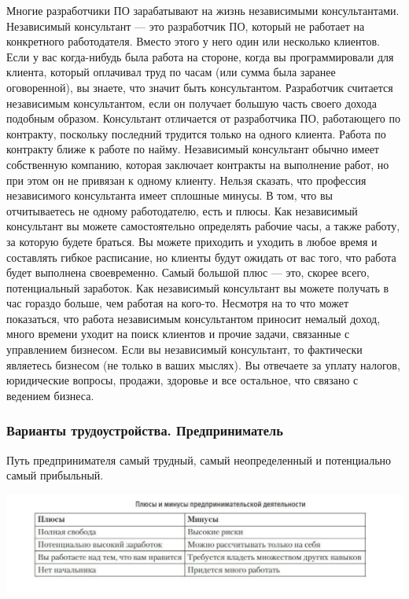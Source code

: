 \documentclass{../industrial-development}
\begin{document}
\lecturenotes
Многие разработчики ПО зарабатывают на жизнь независимыми консультантами. Независимый консультант — это разработчик ПО, который не работает на конкретного работодателя. Вместо этого у него один или несколько клиентов. Если у вас когда-нибудь была работа на стороне, когда вы программировали для клиента, который оплачивал труд по часам (или сумма была заранее оговоренной), вы знаете, что значит быть консультантом.
Разработчик считается независимым консультантом, если он получает большую часть своего дохода подобным образом. Консультант отличается от разработчика ПО, работающего по контракту, поскольку последний трудится только на одного  клиента. Работа по контракту ближе к работе по найму. Независимый консультант обычно имеет собственную компанию, которая заключает контракты на выполнение работ, но при этом он не привязан к одному клиенту.
Нельзя сказать, что профессия независимого консультанта имеет сплошные минусы. В том, что вы отчитываетесь не одному работодателю, есть и плюсы. Как независимый консультант вы можете самостоятельно определять рабочие часы, а также работу, за которую будете браться. Вы можете приходить и уходить в любое время и составлять гибкое расписание, но клиенты будут ожидать от вас того, что работа будет выполнена своевременно.
Самый большой плюс — это, скорее всего, потенциальный заработок. Как независимый консультант вы можете получать в час гораздо больше, чем работая на кого-то. 
Несмотря на то что может показаться, что работа независимым консультантом приносит немалый доход, много времени уходит на поиск клиентов и прочие задачи, связанные с управлением бизнесом. Если вы независимый консультант, то фактически являетесь бизнесом (не только в ваших мыслях). Вы отвечаете за уплату налогов, юридические вопросы, продажи, здоровье и все остальное, что связано с ведением бизнеса.


\begin{frame} \frametitle{Варианты трудоустройства. Предприниматель}
  \begin{block}{}
 Путь предпринимателя самый трудный, самый неопределенный и потенциально самый прибыльный.
  \end{block}
  
  \centerline{\includegraphics[height=0.39\textheight]{11-IT-specialist's-way/pr.pdf}}
\end{frame}
\end{document}
